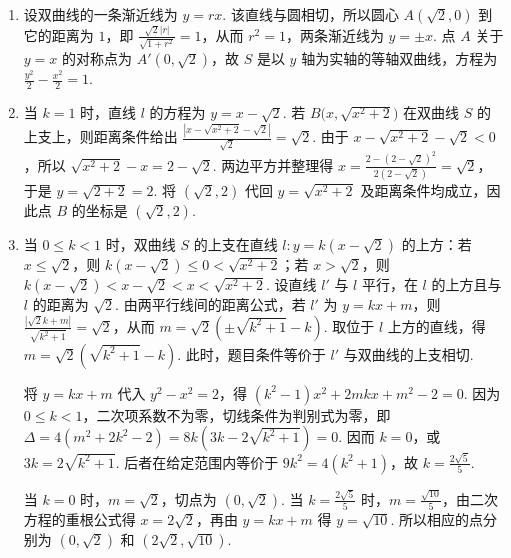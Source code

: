\begin{solution}
\begin{enumerate}
\item 设双曲线的一条渐近线为 \(y=rx\). 该直线与圆相切，所以圆心 \(A(\sqrt{2},0)\) 到它的距离为 \(1\)，即 \(\frac{\sqrt{2}|r|}{\sqrt{1+r^{2}}}=1\)，从而 \(r^{2}=1\)，两条渐近线为 \(y=\pm x\). 点 \(A\) 关于 \(y=x\) 的对称点为 \(A'(0,\sqrt{2})\)，故 \(S\) 是以 \(y\) 轴为实轴的等轴双曲线，方程为 \(\frac{y^{2}}{2}-\frac{x^{2}}{2}=1\).
\item 当 \(k=1\) 时，直线 \(l\) 的方程为 \(y=x-\sqrt{2}\). 若 \(B\bigl(x,\sqrt{x^{2}+2}\bigr)\) 在双曲线 \(S\) 的上支上，则距离条件给出 \(\frac{\left|x-\sqrt{x^{2}+2}-\sqrt{2}\right|}{\sqrt{2}}=\sqrt{2}\). 由于 \(x-\sqrt{x^{2}+2}-\sqrt{2}<0\)，所以 \(\sqrt{x^{2}+2}-x=2-\sqrt{2}\). 两边平方并整理得 \(x=\frac{2-(2-\sqrt{2})^{2}}{2(2-\sqrt{2})}=\sqrt{2}\)，于是 \(y=\sqrt{2+2}=2\). 将 \((\sqrt{2},2)\) 代回 \(y=\sqrt{x^{2}+2}\) 及距离条件均成立，因此点 \(B\) 的坐标是 \((\sqrt{2},2)\).
\item 当 \(0\leqslant k<1\) 时，双曲线 \(S\) 的上支在直线 \(l:y=k(x-\sqrt{2})\) 的上方：若 \(x\leqslant\sqrt{2}\)，则 \(k(x-\sqrt{2})\leqslant0<\sqrt{x^{2}+2}\)；若 \(x>\sqrt{2}\)，则 \(k(x-\sqrt{2})<x-\sqrt{2}<x<\sqrt{x^{2}+2}\). 设直线 \(l'\) 与 \(l\) 平行，在 \(l\) 的上方且与 \(l\) 的距离为 \(\sqrt{2}\). 由两平行线间的距离公式，若 \(l'\) 为 \(y=kx+m\)，则 \(\frac{|\sqrt{2}k+m|}{\sqrt{k^{2}+1}}=\sqrt{2}\)，从而 \(m=\sqrt{2}\left(\pm\sqrt{k^{2}+1}-k\right)\). 取位于 \(l\) 上方的直线，得 \(m=\sqrt{2}\left(\sqrt{k^{2}+1}-k\right)\). 此时，题目条件等价于 \(l'\) 与双曲线的上支相切.

将 \(y=kx+m\) 代入 \(y^{2}-x^{2}=2\)，得 \((k^{2}-1)x^{2}+2mkx+m^{2}-2=0\). 因为 \(0\leqslant k<1\)，二次项系数不为零，切线条件为判别式为零，即 \(\Delta=4(m^{2}+2k^{2}-2)=8k\left(3k-2\sqrt{k^{2}+1}\right)=0\). 因而 \(k=0\)，或 \(3k=2\sqrt{k^{2}+1}\). 后者在给定范围内等价于 \(9k^{2}=4(k^{2}+1)\)，故 \(k=\frac{2\sqrt{5}}{5}\).

当 \(k=0\) 时，\(m=\sqrt{2}\)，切点为 \((0,\sqrt{2})\). 当 \(k=\frac{2\sqrt{5}}{5}\) 时，\(m=\frac{\sqrt{10}}{5}\)，由二次方程的重根公式得 \(x=2\sqrt{2}\)，再由 \(y=kx+m\) 得 \(y=\sqrt{10}\). 所以相应的点分别为 \((0,\sqrt{2})\) 和 \((2\sqrt{2},\sqrt{10})\).
\end{enumerate}
\end{solution}

